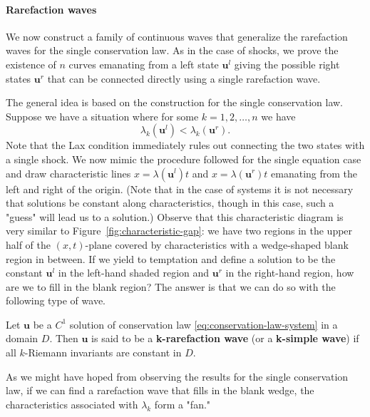 \paragraph*{Rarefaction waves}

We now construct a family of continuous waves that generalize the rarefaction waves for the single conservation law. As in the case of shocks, we prove the existence of $n$ curves emanating from a left state $\bm{u}^l$ giving the possible right states $\bm{u}^r$ that can be connected directly using a single rarefaction wave.

The general idea is based on the construction for the single conservation law. Suppose we have a situation where for some $k=1,2,\ldots,n$ we have
\begin{equation}\label{eq:rarefaction-increasing-characteristic-speed}
\lambda_k(\bm{u}^l)<\lambda_k(\bm{u}^r).
\end{equation}
Note that the Lax condition immediately rules out connecting the two states with a single shock. We now mimic the procedure followed for the single equation case and draw characteristic lines $x=\lambda(\bm{u}^l)t$ and $x=\lambda(\bm{u}^r)t$ emanating from the left and right of the origin. (Note that in the case of systems it is not necessary that solutions be constant along characteristics, though in this case, such a "guess" will lead us to a solution.) Observe that this characteristic diagram is very similar to Figure~\ref{fig:characteristic-gap}: we have two regions in the upper half of the $(x,t)$-plane covered by characteristics with a wedge-shaped blank region in between. If we yield to temptation and define a solution to be the constant $\bm{u}^l$ in the left-hand shaded region and $\bm{u}^r$ in the right-hand region, how are we to fill in the blank region? The answer is that we can do so with the following type of wave.

\begin{Definition}
\label{def:system-simple-wave}
Let $\bm{u}$ be a $C^1$ solution of conservation law \eqref{eq:conservation-law-system} in a domain $D$. Then $\bm{u}$ is said to be a \textbf{k-rarefaction wave} (or a \textbf{k-simple wave}) if all $k$-Riemann invariants are constant in $D$.
\end{Definition}

As we might have hoped from observing the results for the single conservation law, if we can find a rarefaction wave that fills in the blank wedge, the characteristics associated with $\lambda_k$ form a "fan."

